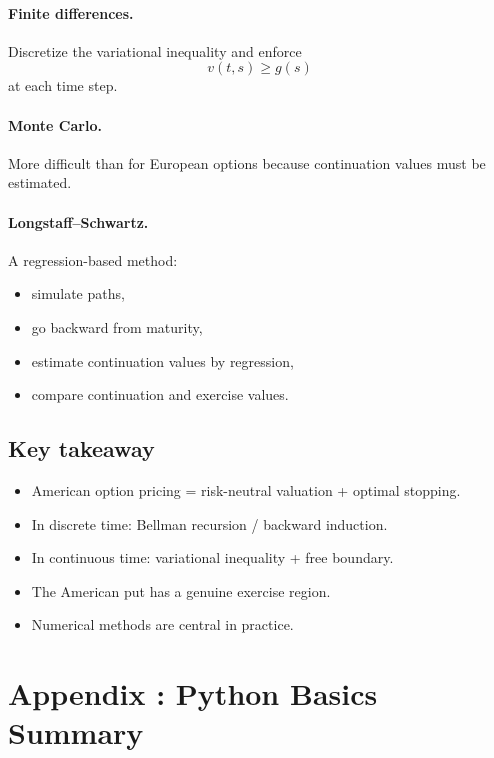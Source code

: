 \documentclass[11pt]{article}
\newcommand{\1}{\mathbf{1}}
\theoremstyle{plain}
\theoremstyle{definition}
\theoremstyle{remark}
\begin{document}
\paragraph{Finite differences.}
Discretize the variational inequality and enforce
\[
v(t,s)\ge g(s)
\]
at each time step.

\paragraph{Monte Carlo.}
More difficult than for European options because continuation values must be estimated.

\paragraph{Longstaff--Schwartz.}
A regression-based method:
\begin{itemize}[leftmargin=1.4em]
\item simulate paths,
\item go backward from maturity,
\item estimate continuation values by regression,
\item compare continuation and exercise values.
\end{itemize}

\subsection{Key takeaway}

\begin{itemize}[leftmargin=1.4em]
\item American option pricing = risk-neutral valuation + optimal stopping.
\item In discrete time: Bellman recursion / backward induction.
\item In continuous time: variational inequality + free boundary.
\item The American put has a genuine exercise region.
\item Numerical methods are central in practice.
\end{itemize}
\newpage 

\section{Appendix : Python Basics Summary}
\end{document}
